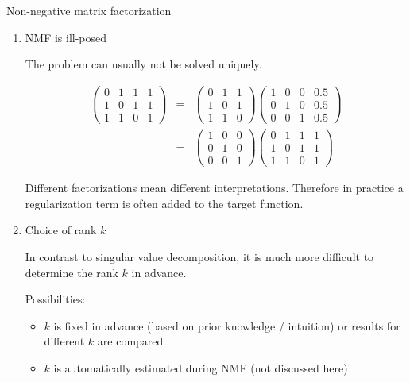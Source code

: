 \documentclass[11pt,compress,t,notes=noshow, xcolor=table]{beamer}
\begin{document}
\begin{vbframe}{Non-negative matrix factorization}
\begin{enumerate}
\framebreak

\item NMF is ill-posed \\

\lz

The problem can usually not be solved uniquely.

\begin{eqnarray*}
\begin{pmatrix} 0 & 1 & 1 & 1 \\
1 & 0 & 1 & 1 \\
1 & 1 & 0 & 1 \end{pmatrix} &=& \begin{pmatrix} 0 & 1 & 1  \\
1 & 0 & 1 \\
1 & 1 & 0 \end{pmatrix} \begin{pmatrix} 1 & 0 & 0 & 0.5 \\
0 & 1 & 0 & 0.5 \\
0 & 0 & 1 & 0.5 \end{pmatrix} \\ &=&
\begin{pmatrix} 1 & 0 & 0  \\
0 & 1 & 0 \\
0 & 0 & 1 \end{pmatrix} \begin{pmatrix} 0 & 1 & 1 & 1 \\
1 & 0 & 1 & 1 \\
1 & 1 & 0 & 1 \end{pmatrix}
\end{eqnarray*}

Different factorizations mean different interpretations. Therefore in practice a regularization term is often added to the target function.

\framebreak

\item Choice of rank $k$

\lz

In contrast to singular value decomposition, it is much more difficult to determine the rank $k$ in advance.

\lz

Possibilities:

\begin{itemize}
\item $k$ is fixed in advance (based on prior knowledge / intuition) or results for different $k$ are compared
\item $k$ is automatically estimated during NMF (not discussed here)
\end{itemize}

\end{enumerate}

\end{vbframe}
\end{document}
